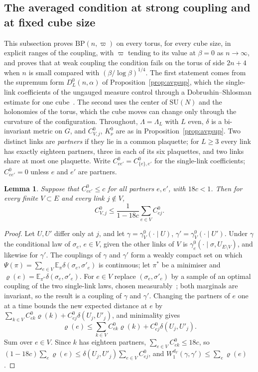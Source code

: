 \documentclass[aps,prd,twocolumn,superscriptaddress,nofootinbib,longbibliography,floatfix,amsmath,amssymb,10pt]{revtex4-2}
\newtheorem{lemma}[theorem]{Lemma}
\theoremstyle{definition}
\theoremstyle{remark}
\newcommand{\E}{\mathbb{E}}
\newcommand{\SU}{\mathrm{SU}}
\begin{document}
\subsection{The averaged condition at strong coupling and at fixed cube
size}\label{ssec:bpstrong}

This subsection proves $\mathrm{BP}(n,\varpi)$ on every torus, for every
cube size, in explicit ranges of the coupling, with $\varpi$ tending to
its value at $\beta=0$ as $n\to\infty$, and proves that at weak coupling
the condition fails on the torus of side $2n+4$ when $n$ is small compared
with $(\beta/\log\beta)^{1/4}$. The first statement comes from the supremum
form $D^0_L(n,\alpha)$ of Proposition~\ref{prop:avgsup}, which the
single-link coefficients of the ungauged measure control through a
Dobrushin--Shlosman estimate for one cube~\cite{DS85}. The second uses the
center of $\SU(N)$ and the holonomies of the torus, which the cube moves
can change only through the curvature of the configuration. Throughout,
$\Lambda=\Lambda_L$ with $L$ even, $\delta$ is a bi-invariant metric on $G$,
and $C^0_{V,j}$, $K^0_\nu$ are as in Proposition~\ref{prop:avgsup}. Two
distinct links are \emph{partners} if they lie in a common plaquette; for
$L\ge3$ every link has exactly eighteen partners, three in each of its six
plaquettes, and two links share at most one plaquette. Write $C^0_{ee'}=
C^0_{\{e\},e'}$ for the single-link coefficients; $C^0_{ee'}=0$ unless $e$
and $e'$ are partners.

\begin{lemma}\label{lem:bpblock}
Suppose that $C^0_{ee'}\le c$ for all partners $e,e'$, with $18c<1$. Then
for every finite $V\subset E$ and every link $j\notin V$,
\[
C^0_{V,j}\le\frac1{1-18c}\sum_{e\in V}C^0_{ej}.
\]
\end{lemma}

\begin{proof}
Let $U,U'$ differ only at $j$, and let $\gamma=\gamma^0_V(\cdot\mid U)$,
$\gamma'=\gamma^0_V(\cdot\mid U')$. Under $\gamma$ the conditional law of
$\sigma_e$, $e\in V$, given the other links of $V$ is $\gamma^0_e(\cdot\mid
\sigma,U_{E\setminus V})$, and likewise for $\gamma'$. The couplings of
$\gamma$ and $\gamma'$ form a weakly compact set on which $\Psi(\pi)=\sum_{e
\in V}\E_\pi\delta(\sigma_e,\sigma'_e)$ is continuous; let $\pi^*$ be a
minimiser and $\varrho(e)=\E_{\pi^*}\delta(\sigma_e,\sigma'_e)$. For $e\in V$
replace $(\sigma_e,\sigma'_e)$ by a sample of an optimal coupling of the two
single-link laws, chosen measurably~\cite[Cor.~5.22]{Vil09}; both marginals
are invariant, so the result is a coupling of $\gamma$ and $\gamma'$.
Changing the partners of $e$ one at a time bounds the new expected distance
at $e$ by $\sum_{k\in V}C^0_{ek}\varrho(k)+C^0_{ej}\delta(U_j,U'_j)$, and
minimality gives
\[
\varrho(e)\le\sum_{k\in V}C^0_{ek}\varrho(k)+C^0_{ej}\delta(U_j,U'_j).
\]
Sum over $e\in V$. Since $k$ has eighteen partners, $\sum_{e\in V}C^0_{ek}\le
18c$, so $(1-18c)\sum_e\varrho(e)\le\delta(U_j,U'_j)\sum_{e\in V}C^0_{ej}$,
and $W_1^{d_V}(\gamma,\gamma')\le\sum_e\varrho(e)$.
\end{proof}
\end{document}
